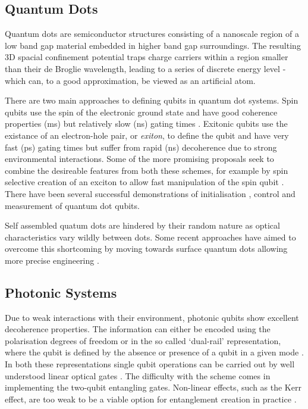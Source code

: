 \subsection{Quantum Dots}

Quantum dots are semiconductor structures consisting of a nanoscale region of a low band gap material embedded in higher band gap surroundings. The resulting 3D spacial confinement potential traps charge carriers within a region smaller than their de Broglie wavelength, leading to a series of discrete energy level - which can, to a good approximation, be viewed as an artificial atom.

There are two main approaches to defining qubits in quantum dot systems. Spin qubits use the spin of the electronic ground state and have good coherence properties (ms) \cite{Kroutvar:2004p4951, Greilich:2006p5031} but relatively slow (ns) gating times \cite{Burkard:1999p5057}. Exitonic qubits use the existance of an electron-hole pair, or \textit{exiton}, to define the qubit and have very fast (ps) gating times \cite{Li:2003p5178} but suffer from rapid (ns) decoherence due to strong environmental interactions. Some of the more promising proposals seek to combine the desireable features from both these schemes, for example by spin selective creation of an exciton to allow fast manipulation of the spin qubit \cite{Calarco:2003p5363, Chen:2000p5290, Yokoi:2005p5390}. There have been several successful demonstrations of initialisation \cite{atature_quantum_dot_06, gerardot_dot_08}, control \cite{quantum_dot_control_08} and measurement \cite{quantum_dot_measurement_06} of quantum dot qubits.

Self assembled quatum dots are hindered by their random nature as optical characteristics vary wildly between dots. Some recent approaches have aimed to overcome this shortcoming by moving towards surface quantum dots allowing more precise engineering \cite{quantum_dot_nanowires_example}.


\subsection{Photonic Systems}

Due to weak interactions with their environment, photonic qubits show excellent decoherence properties. The information can either be encoded using the polarisation degrees of freedom or in the so called `dual-rail' representation, where the qubit is defined by the absence or presence of a qubit in a given mode \cite{loqc_review_07}. In both these representations single qubit operations can be carried out by well understood linear optical gates \cite{fox_quantum_optics, walls+milburn}. The difficulty with the scheme comes in implementing the two-qubit entangling gates. Non-linear effects, such as the Kerr effect, are too weak to be a viable option for entanglement creation in practice \cite{kerr_too_weak_06}.

